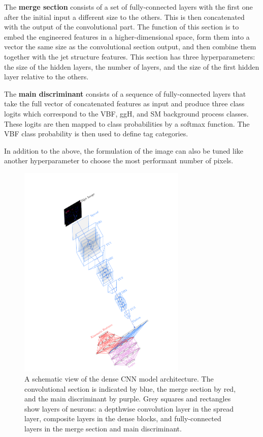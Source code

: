 The \textbf{merge section} consists of a set of fully-connected layers with the first one after the initial input a different size to the others. This is then concatenated with the output of the convolutional part.
The function of this section is to embed the engineered features in a higher-dimensional space, form them into a vector the same size as the convolutional section output, and then combine them together with the jet structure features. This section has three hyperparameters: the size of the hidden layers, the number of layers, and the size of the first hidden layer relative to the others. 


The \textbf{main discriminant} consists of a sequence of fully-connected layers that take the full vector of concatenated features as input and produce three class logits which correspond to the VBF, ggH, and SM background process classes. 
These logits are then mapped to class probabilities by a softmax function. The VBF class probability is then used to define tag categories. 

In addition to the above, the formulation of the image can also be tuned like another hyperparameter to choose the most performant number of pixels. 

\newpage
\begin{figure}[h!]
    \centering
    \includegraphics[width=0.715\textwidth]{figures/event_selection/VBF_DCNN_figure.pdf}
    \caption{A schematic view of the dense CNN model architecture. The convolutional section is indicated by blue, the merge section by red, and the main discriminant by purple.
             Grey squares and rectangles show layers of neurons: a depthwise convolution layer in the spread layer, composite layers in the dense blocks, and fully-connected layers
             in the merge section and main discriminant.}
    \label{fig:event_categorisation:vbf_dcnn_figure}
\end{figure}



